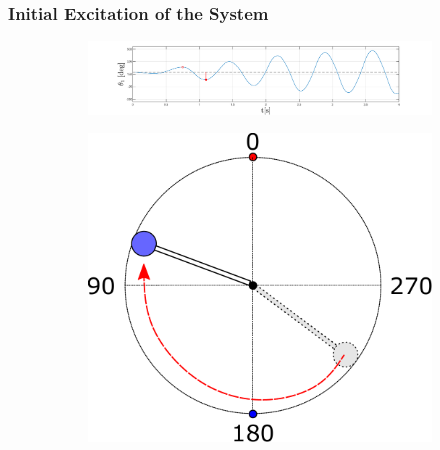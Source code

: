 \documentclass[]{beamer}
\begin{document}
\begin{frame}
	\frametitle{Initial Excitation of the System}
	\begin{figure}[H]
		\centering
		\begin{subfigure}
			\centering
			\includegraphics[scale=0.25]{images/swings2/swing4.pdf}  
		\end{subfigure}
		\begin{subfigure}
			\centering
			\includegraphics[scale=0.25]{images/swing3.pdf}  
		\end{subfigure}
	\end{figure}
\end{frame}
\end{document}
